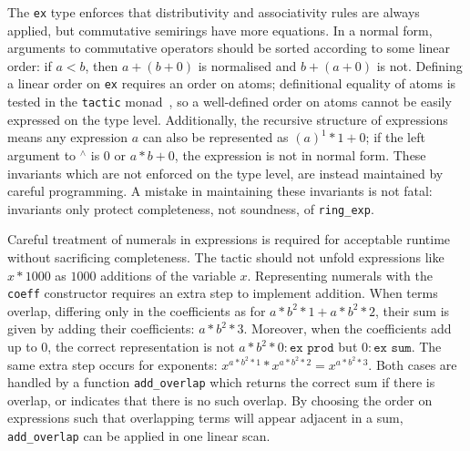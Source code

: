 \documentclass{llncs}
\newcommand{\lean}[1]{\texttt{#1}\xspace} %
\newcommand{\ex}{\lean{ex}}
\newcommand{\pow}{{${}^\wedge$}\xspace}
\newcommand{\ringexp}{\lean{ring\_exp}}
\begin{document}
The \ex type enforces that distributivity and associativity rules are always applied,
but commutative semirings have more equations.
In a normal form, arguments to commutative operators should be sorted according to some linear order: if $a < b$, then $a + (b + 0)$ is normalised and $b + (a + 0)$ is not.
Defining a linear order on \ex requires an order on atoms; definitional equality of atoms is tested in the \lean{tactic} monad~\cite{lean-tactics},
so a well-defined order on atoms cannot be easily expressed on the type level.
Additionally, the recursive structure of expressions
means any expression $a$ can also be represented as $(a)^1*1 + 0$;
if the left argument to \pow is $0$ or $a * b + 0$, the expression is not in normal form.
These invariants which are not enforced on the type level, are instead maintained by careful programming.
A mistake in maintaining these invariants is not fatal: invariants only protect completeness, not soundness, of \ringexp.

Careful treatment of numerals in expressions is required for acceptable runtime without sacrificing completeness.
The tactic should not unfold expressions like $x * 1000$ as $1000$ additions of the variable $x$.
Representing numerals with the \lean{coeff} constructor requires an extra step to implement addition.
When terms overlap, differing only in the coefficients as for $a * b^2 * 1 + a * b^2 * 2$,
their sum is given by adding their coefficients: $a * b^2 * 3$.
Moreover, when the coefficients add up to $0$, the correct representation is not $a * b^2 * 0 : \lean{ex prod}$ but $0 : \lean{ex sum}$.
The same extra step occurs for exponents: $x ^ {a * b^2 * 1} * x ^ {a * b^2 * 2} %
= x ^ {a * b^2 * 3}$.
Both cases are handled by a function \lean{add\_overlap} which returns the correct sum if there is overlap,
or indicates that there is no such overlap.
By choosing the order on expressions such that overlapping terms will appear adjacent in a sum,
\lean{add\_overlap} can be applied in one linear scan.
\end{document}
